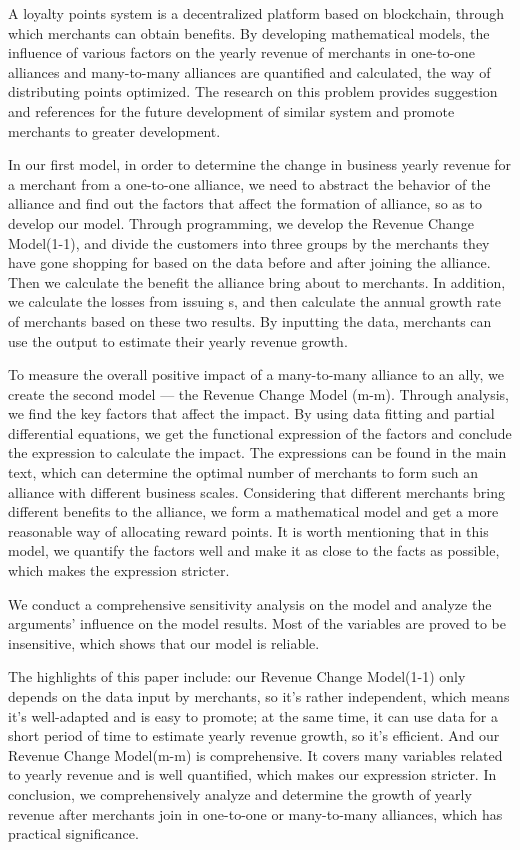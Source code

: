 \hspace{\parindent} A loyalty points system is a decentralized platform based on blockchain, through which merchants can obtain benefits. By developing mathematical models, the influence of various factors on the yearly revenue of merchants in one-to-one alliances and many-to-many alliances are quantified and calculated, the way of distributing points optimized. The research on this problem provides suggestion and references for the future development of similar system and promote merchants to greater development.

In our first model, in order to determine the change in business yearly revenue for a merchant from a one-to-one alliance, we need to abstract the behavior of the alliance and find out the factors that affect the formation of alliance, so as to develop our model. Through programming, we develop the Revenue Change Model(1-1), and divide the customers into three groups by the merchants they have gone shopping for based on the data before and after joining the alliance. Then we calculate the benefit the alliance bring about to merchants. In addition, we calculate the losses from issuing \RPd s, and then calculate the annual growth rate of merchants based on these two results. By inputting the data, merchants can use the output to estimate their yearly revenue growth.

To measure the overall positive impact of a many-to-many alliance to an ally, we create the second model --- the Revenue Change Model (m-m). Through analysis, we find the key factors that affect the impact. By using data fitting and partial differential equations, we get the functional expression of the factors and conclude the expression to calculate the impact. The expressions can be found in the main text, which can determine the optimal number of merchants to form such an alliance with different business scales. Considering that different merchants bring different benefits to the alliance, we form a mathematical model and get a more reasonable way of allocating reward points. It is worth mentioning that in this model, we quantify the factors well and make it as close to the facts as possible, which makes the expression stricter.

We conduct a comprehensive sensitivity analysis on the model and analyze the arguments' influence on the model results. Most of the variables are proved to be insensitive, which shows that our model is reliable.

The highlights of this paper include: our Revenue Change Model(1-1) only depends on the data input by merchants, so it's rather independent, which means it's well-adapted and is easy to promote; at the same time, it can use data for a short period of time to estimate yearly revenue growth, so it's efficient. And our Revenue Change Model(m-m) is comprehensive. It covers many variables related to yearly revenue and is well quantified, which makes our expression stricter. In conclusion, we comprehensively analyze and determine the growth of yearly revenue after merchants join in one-to-one or many-to-many alliances, which has practical significance.